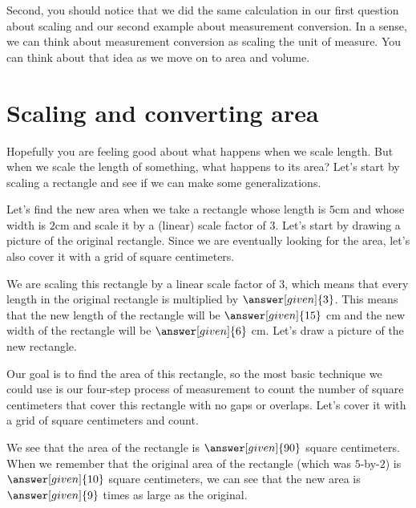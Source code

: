 \documentclass{ximera}
\begin{document}
Second, you should notice that we did the same calculation in our first question about scaling and our second example about measurement conversion. In a sense, we can think about measurement conversion as scaling the unit of measure. You can think about that idea as we move on to area and volume.



\section{Scaling and converting area}
Hopefully you are feeling good about what happens when we scale length. But when we scale the length of something, what happens to its area? Let's start by scaling a rectangle and see if we can make some generalizations.

\begin{example}
Let's find the new area when we take a rectangle whose length is $5$cm and whose width is $2$cm and scale it by a (linear) scale factor of $3$. Let's start by drawing a picture of the original rectangle. Since we are eventually looking for the area, let's also cover it with a grid of square centimeters.
\begin{image}
\end{image}
We are scaling this rectangle by a linear scale factor of $3$, which means that every length in the original rectangle is multiplied by $\answer[given]{3}$. This means that the new length of the rectangle will be $\answer[given]{15}$ cm and the new width of the rectangle will be $\answer[given]{6}$ cm. Let's draw a picture of the new rectangle.

\begin{image}
\end{image}

Our goal is to find the area of this rectangle, so the most basic technique we could use is our four-step process of measurement to count the number of square centimeters that cover this rectangle with no gaps or overlaps. Let's cover it with a grid of square centimeters and count. 
\begin{image}
\end{image}
We see that the area of the rectangle is $\answer[given]{90}$ square centimeters. When we remember that the original area of the rectangle (which was $5$-by-$2$) is $\answer[given]{10}$ square centimeters, we can see that the new area is $\answer[given]{9}$ times as large as the original.
\end{example}
\end{document}
